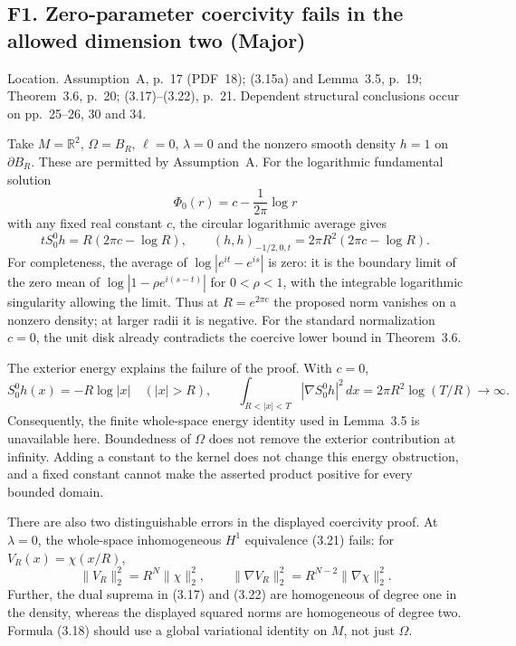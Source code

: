 \documentclass[10pt]{article}
\begin{document}
\subsection*{F1. Zero-parameter coercivity fails in the allowed dimension two (Major)}
Location. Assumption A, p. 17 (PDF 18); (3.15a) and Lemma 3.5, p. 19; Theorem 3.6, p. 20; (3.17)–(3.22), p. 21. Dependent structural conclusions occur on pp. 25–26, 30 and 34.\par
Take \(M=\mathbb R^2\), \(\Omega=B_R\), \(\ell=0\), \(\lambda=0\) and the nonzero smooth density \(h=1\) on \(\partial B_R\). These are permitted by Assumption A. For the logarithmic fundamental solution \[\Phi_0(r)=c-\frac{1}{2\pi}\log r\] with any fixed real constant \(c\), the circular logarithmic average gives \[tS_0^0h=R(2\pi c-\log R),\qquad
 (h,h)_{-1/2,0,t}=2\pi R^2(2\pi c-\log R).\] For completeness, the average of \(\log|e^{it}-e^{is}|\) is zero: it is the boundary limit of the zero mean of \(\log|1-\rho e^{i(s-t)}|\) for \(0<\rho<1\), with the integrable logarithmic singularity allowing the limit. Thus at \(R=e^{2\pi c}\) the proposed norm vanishes on a nonzero density; at larger radii it is negative. For the standard normalization \(c=0\), the unit disk already contradicts the coercive lower bound in Theorem 3.6.\par
The exterior energy explains the failure of the proof. With \(c=0\), \[S_0^0h(x)=-R\log|x| \quad (|x|>R),\qquad
 \int_{R<|x|<T}|\nabla S_0^0h|^2\,dx
   =2\pi R^2\log(T/R)\longrightarrow\infty.\] Consequently, the finite whole-space energy identity used in Lemma 3.5 is unavailable here. Boundedness of \(\Omega\) does not remove the exterior contribution at infinity. Adding a constant to the kernel does not change this energy obstruction, and a fixed constant cannot make the asserted product positive for every bounded domain.\par
There are also two distinguishable errors in the displayed coercivity proof. At \(\lambda=0\), the whole-space inhomogeneous \(H^1\) equivalence (3.21) fails: for \(V_R(x)=\chi(x/R)\), \[\|V_R\|_2^2=R^N\|\chi\|_2^2,\qquad
 \|\nabla V_R\|_2^2=R^{N-2}\|\nabla\chi\|_2^2.\] Further, the dual suprema in (3.17) and (3.22) are homogeneous of degree one in the density, whereas the displayed squared norms are homogeneous of degree two. Formula (3.18) should use a global variational identity on \(M\), not just \(\Omega\).\par
\end{document}

